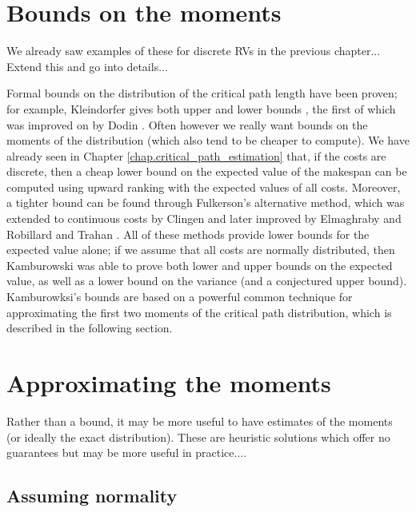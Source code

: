 \documentclass[12pt]{article}
\begin{document}
\section{Bounds on the moments}
\label{sect.stochastic_bounds}

We already saw examples of these for discrete RVs in the previous chapter... Extend this and go into details...

Formal bounds on the distribution of the critical path length have been proven; for example, Kleindorfer gives both upper and lower bounds \cite{kle71}, the first of which was improved on by Dodin \cite{dod85}. Often however we really want bounds on the moments of the distribution (which also tend to be cheaper to compute). We have already seen in Chapter \ref{chap.critical_path_estimation} that, if the costs are discrete, then a cheap lower bound on the expected value of the makespan can be computed using upward ranking with the expected values of all costs. Moreover, a tighter bound can be found through Fulkerson's \cite{ful62} alternative method, which was extended to continuous costs by Clingen \cite{cli64} and later improved by Elmaghraby \cite{elm67} and Robillard and Trahan \cite{rob76}. All of these methods provide lower bounds for the expected value alone; if we assume that all costs are normally distributed, then Kamburowski \cite{kam85} was able to prove both lower and upper bounds on the expected value, as well as a lower bound on the variance (and a conjectured upper bound). Kamburowksi's bounds are based on a powerful common technique for approximating the first two moments of the critical path distribution, which is described in the following section.

\section{Approximating the moments}
\label{sect.approximating_moments}

Rather than a bound, it may be more useful to have estimates of the moments (or ideally the exact distribution). These are heuristic solutions which offer no guarantees but may be more useful in practice....

\subsection{Assuming normality}
\label{subsect.normality}
\end{document}
